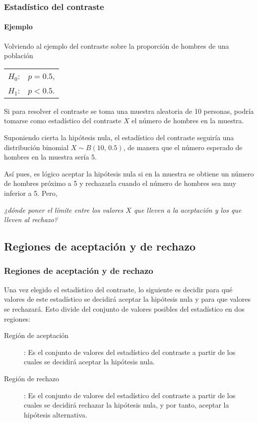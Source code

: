 \begin{frame}
\frametitle{Estadístico del contraste}
\framesubtitle{Ejemplo}
Volviendo al ejemplo del contraste sobre la proporción de hombres de una población
\begin{center}
\begin{tabular}{ll}
$H_0$: & $p=0.5$,\\
$H_1$: & $p<0.5$.
\end{tabular}
\end{center}
Si para resolver el contraste se toma una muestra aleatoria de 10 personas, podría tomarse como estadístico del contraste $X$ el número de hombres en la muestra.

Suponiendo cierta la hipótesis nula, el estadístico del contraste seguiría una distribución binomial $X\sim B(10,\,0.5)$, de manera que el número esperado de hombres en la muestra sería 5.

Así pues, es lógico aceptar la hipótesis nula si en la muestra se obtiene un número de hombres próximo a 5 y rechazarla cuando el número de hombres sea muy inferior a 5. Pero,
\begin{center} 
\emph{¿dónde poner el límite entre los valores $X$ que lleven a la aceptación y los que lleven al rechazo?} 
\end{center}
\end{frame}


\subsection{Regiones de aceptación y de rechazo}
\begin{frame}
\frametitle{Regiones de aceptación y de rechazo}
Una vez elegido el estadístico del contraste, lo siguiente es decidir para qué valores de este estadístico se decidirá aceptar la hipótesis nula y para que valores se rechazará. 
Esto divide del conjunto de valores posibles del estadístico en dos regiones:
\begin{description}
\item[Región de aceptación]: Es el conjunto de valores del estadístico del contraste a partir de los cuales se decidirá aceptar la hipótesis nula.
\item[Región de rechazo]: Es el conjunto de valores del estadístico del contraste a partir de los cuales se decidirá rechazar la hipótesis nula, y por tanto, aceptar la hipótesis alternativa. 
\end{description}
\end{frame}


